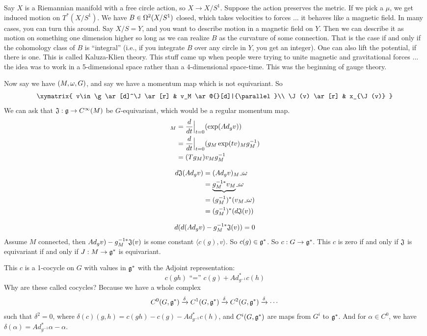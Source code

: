  Say $X$ is a Riemannian manifold with a free circle action, so $X\to X/S^1$.  Suppose
 the action preserves the metric.  If we pick a $\mu$, we get induced motion on
 $T^*(X/S^1)$.  We have $B\in \Omega^2(X/S^1)$ closed, which takes velocities to forces
 ... it behaves like a magnetic field.  In many cases, you can turn this around.  Say
 $X/S=Y$, and you want to describe motion in a magnetic field on $Y$.  Then we can
 describe it as motion on something one dimension higher so long as we can realize $B$
 as the curvature of some connection.  That is the case if and only if the cohomology
 class of $B$ is ``integral'' (i.e., if you integrate $B$ over any circle in $Y$, you
 get an integer).  One can also lift the potential, if there is one.  This is called
 Kaluza-Klien theory.  This stuff came up when people were trying to unite magnetic
 and gravitational forces ... the idea was to work in a 5-dimensional space rather
 than a 4-dimensional space-time.  This was the beginning of gauge theory.

 Now say we have $(M,\omega,G)$, and say we have a momentum map which is not equivariant.
 So
 \[\xymatrix{
 v\in \g\ar[d]^\J \ar[r] & v_M \ar@{}[d]|{\parallel}\\
 \J(v) \ar[r] & x_{\J(v)}
 }\]
 We can ask that $\mathfrak{J}:\mathfrak{g}\to C^\infty(M)$ be $G$-equivariant, which would be a regular momentum map.
 \begin{align*}
   [Ad_g v]_M &= \der{}{t}{\Big |}_{t=0} (\exp(Ad_g v))\\
    &= \der{}{t}{\Big |}_{t=0} (g_M \exp(tv)_M g_M^{-1})\\
    &= (Tg_M) v_M g_M^{-1}
 \end{align*}

 \begin{align*}
   d\mathfrak{J}(Ad_g v) &= (Ad_gv)_M\lrcorner \omega\\
    &= \underbrace{g_M^{-1*}v_M} \lrcorner \omega\\
    &= (g_M^{-1})^*(v_M\lrcorner \omega)\\
    &= (g_M^{-1})^* (d\mathfrak{J}(v))
 \end{align*}

 \[
    d(d(Ad_{g} v) - g_M^{-1*}\mathfrak{J}(v))=0
 \]
 Assume $M$ connected, then $Ad_{g} v) - g_M^{-1*}\mathfrak{J}(v)$ is some constant $\langle
 c(g),v\rangle$.  So $c(g)\in \mathfrak{g}^*$.  So $c:G\to \mathfrak{g}^*$.  This $c$ is zero if and only
 if $\mathfrak{J}$ is equivariant if and only if $J:M\to \mathfrak{g}^*$ is equivariant.

 This $c$ is a 1-cocycle on $G$ with values in $\mathfrak{g}^*$ with the Adjoint representation:
 \[
    c(gh) \text{ ``='' } c(g)+Ad^*_{g^{-1}}c(h)
 \]
 Why are these called cocycles?  Because we have a whole complex
 \[
    C^0(G,\mathfrak{g}^*) \xrightarrow{\delta} C^1(G,\mathfrak{g}^*) \xrightarrow{\delta} C^2(G,\mathfrak{g}^*)
    \xrightarrow{\delta} \cdots
 \]
 such that $\delta^2=0$, where $\delta(c)(g,h)= c(gh)-c(g)-Ad^*_{g^{-1}}c(h)$, and
 $C^i(G,\mathfrak{g}^*)$ are maps from $G^i$ to $\mathfrak{g}^*$.  And for $\alpha \in C^0$, we have
 $\delta(\alpha)= Ad_{g^{-1}}^*\alpha - \alpha$.

